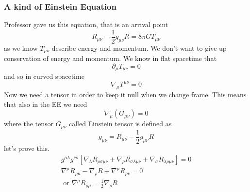 \subsubsection{A kind of Einstein Equation}
Professor gave us this equation, that is an arrival point
\begin{equation}
R_{\mu \nu } - \frac{1}{2}g_{\mu \nu }R = 8\pi G T_{\mu \nu }
\end{equation}
as we know $T_{\mu \nu }$ describe energy and momentum. We don't want to give up conservation of energy and momentum. 
We know in flat spacetime that
\[
\partial_{\mu }T_{\mu \nu } = 0 
\]
and so in curved spacetime 
\[
\nabla _{\mu }T^{\mu \nu }= 0
\]
Now we need a tensor in order to keep it null when we change frame. This means that also in the EE we need 
\[
\nabla _{\mu }\left( G_{\mu \nu } \right) = 0
\]
where the tensor $G_{\mu \nu }$ called Einstein tensor is defined as
\begin{equation}
g_{\mu \nu } = R_{\mu \nu } - \frac{1}{2} g_{\mu \nu }R
\end{equation}
let's prove this.
\begin{gather*}
	g^{\mu \lambda } g^{\nu \sigma } \left[ \nabla _{\lambda } R_{\rho \sigma \mu \nu } + \nabla _{\rho }R_{\sigma \lambda \mu \nu } + \nabla _{\sigma }R_{\lambda \rho \mu \nu }\right] = 0 \\
	\nabla ^{\mu }R_{\rho \mu } - \nabla _{\rho }R + \nabla ^{\mu }R_{\rho \nu }  = 0\\
	\text{ or } \nabla ^{\mu }R_{\rho \mu } = \frac{1}{2} \nabla _{\rho }R
\end{gather*}

































